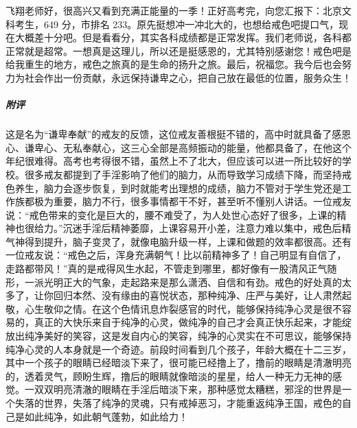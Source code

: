\begin{case}
    飞翔老师好，很高兴又看到充满正能量的一季！正好高考完，向您汇报下：北京文科考生，649 分，市排名 233。原先挺想冲一冲北大的，也想给戒色吧提口气，现在大概差十分吧。但是看看分，其实各科成绩都是正常发挥。我们老师说，各科都正常就是超常。一想真是这理儿，所以还是挺感恩的，尤其特别感谢您！戒色吧是给我重生的地方，戒色之旅真的是生命的扬升之旅。最后，祝福您。我今后也会努力为社会作出一份贡献，永远保持谦卑之心，把自己放在最低的位置，服务众生！
    \subparagraph{附评} 这是名为“谦卑奉献”的戒友的反馈，这位戒友善根挺不错的，高中时就具备了感恩心、谦卑心、无私奉献心，这三心全部是高频振动的能量，他都具备了，在他这个年纪很难得。高考也考得很不错，虽然上不了北大，但应该可以进一所比较好的学校。很多戒友都提到了手淫影响了他们的脑力，从而导致学习成绩下降，而坚持戒色养生，脑力会逐步恢复，到时就能考出理想的成绩，脑力不管对于学生党还是工作族都极为重要，脑力不行，很多事情都干不好，甚至听不懂别人讲话。一位戒友说：“戒色带来的变化是巨大的，腰不难受了，为人处世心态好了很多，上课的精神也很给力。”沉迷手淫后精神萎靡，上课容易开小差，注意力难以集中，戒色后精气神得到提升，脑子变灵了，就像电脑升级一样，上课和做题的效率都很高。还有一位戒友说：“戒色之后，浑身充满朝气！比以前精神多了！自己明显有自信了，走路都带风！”真的是戒得风生水起，不管走到哪里，都好像有一股清风正气随形，一派光明正大的气象，走起路来是那么潇洒、自信和有劲。戒色的好处真的太多了，让你回归本然、没有缘由的喜悦状态，那种纯净、庄严与美好，让人肃然起敬，心生敬仰之情。在这个色情讯息炸裂感官的时代，能够保持纯净心灵是很不容易的，真正的大快乐来自于纯净的心灵，做纯净的自己才会真正快乐起来，才能绽放出纯净美好的笑容，这是发自内心的笑容，纯净的心灵实在不可思议，能够保持纯净心灵的人本身就是一个奇迹。前段时间看到几个孩子，年龄大概在十二三岁，其中一个孩子的眼睛已经暗淡下来了，很可能已经撸上了，撸前的眼睛是清澈明亮的，透着灵气，顾盼生辉，撸后的眼睛就像暗淡的星星，给人一种无力无神的感觉。一双双明亮清澈的眼睛在手淫后暗淡下来，那种感觉太糟糕，邪淫的世界是一个失落的世界，失落了纯净的灵魂，只有戒掉恶习，才能重返纯净王国，戒色的自己是如此纯净，如此朝气蓬勃，如此给力！
\end{case}

